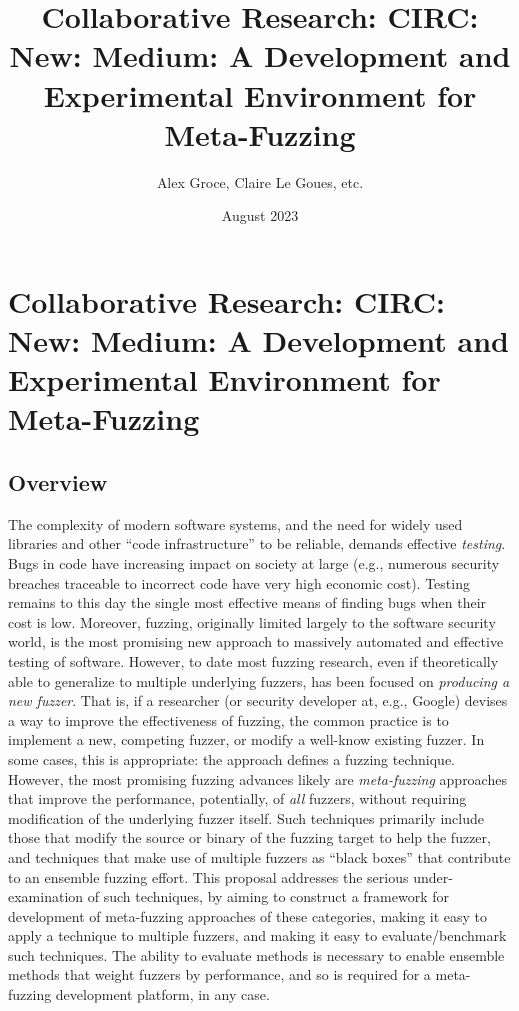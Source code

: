 \documentclass[numbers]{proposalnsf}
\title{Collaborative Research: CIRC: New: Medium: A Development and Experimental Environment for Meta-Fuzzing}
\author{Alex Groce, Claire Le Goues, etc.}
\date{August 2023}
\begin{document}
\section*{Collaborative Research: CIRC: New: Medium: A Development and Experimental Environment for Meta-Fuzzing}

\subsection*{Overview}
\vspace{-2mm}


The complexity of modern software systems, and the need for widely used libraries and other ``code infrastructure'' to be reliable, demands effective \emph{testing}.  Bugs in code have increasing impact on society at large (e.g., numerous security breaches traceable to incorrect code have very high economic cost).  Testing remains to this day the single most effective means of finding bugs when their cost is low.   Moreover, fuzzing, originally limited largely to the software security world, is the most promising new approach to massively automated and effective testing of software.   However, to date most fuzzing research, even if theoretically able to generalize to multiple underlying fuzzers, has been focused on \emph{producing a new fuzzer}.  That is, if a researcher (or security developer at, e.g., Google) devises a way to improve the effectiveness of fuzzing, the common practice is to implement a new, competing fuzzer, or modify a well-know existing fuzzer.  In some cases, this is appropriate: the approach defines a fuzzing technique.  However, the most promising fuzzing advances likely are \emph{meta-fuzzing} approaches that improve the performance, potentially, of \emph{all} fuzzers, without requiring modification of the underlying fuzzer itself.  Such techniques primarily include those that modify the source or binary of the fuzzing target to help the fuzzer, and techniques that make use of multiple fuzzers as ``black boxes'' that contribute to an ensemble fuzzing effort.  This proposal addresses the serious under-examination of such techniques, by aiming to construct a framework for development of meta-fuzzing approaches of these categories, making it easy to apply a technique to multiple fuzzers, and making it easy to evaluate/benchmark such techniques.  The ability to evaluate methods is necessary to enable ensemble methods that weight fuzzers by performance, and so is required for a meta-fuzzing development platform, in any case.
\end{document}
